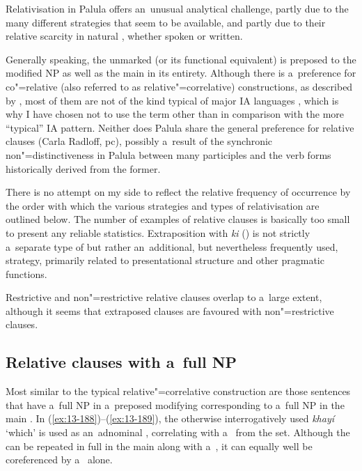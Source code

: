 Relativisation in Palula offers an~unusual analytical challenge, partly due to the many different strategies that seem to be available, and partly due to their relative scarcity in natural , whether spoken or written. 



Generally speaking, the unmarked  (or its functional equivalent) is preposed to the modified NP as well as the main  in its entirety. Although there is a~preference for co"=relative (also referred to as relative"=correlative) constructions, as described by \citet{downing1974}, most of them are not of the kind typical of major IA languages \citep[410--415]{masica1991}, which is why I have chosen not to use the term other than in comparison with the more ``typical'' IA pattern. Neither does Palula share the general \iliShina preference for  relative clauses (Carla Radloff, pc), possibly a~result of the synchronic non"=distinctiveness in Palula between many participles and the  verb forms historically derived from the former.



There is no attempt on my side to reflect the relative frequency of occurrence by the order with which the various strategies and types of relativisation are outlined below. The number of examples of relative clauses is basically too small to present any reliable statistics. Extraposition with \textit{ki} () is not strictly a~separate type of  but rather an~additional, but nevertheless frequently used, strategy, primarily related to presentational structure and other pragmatic functions.



Restrictive and non"=restrictive relative clauses overlap to a~large extent, although it seems that extraposed clauses are favoured with non"=restrictive clauses.


\subsection{Relative clauses with a~full NP}
\label{subsec:13-6-1}


Most similar to the typical \iliUrduHindi relative"=correlative construction are those sentences that have a~full NP in a~preposed modifying  corresponding to a~full NP in the main . In (\ref{ex:13-188})--(\ref{ex:13-189}), the otherwise interrogatively used \textit{khayí} `which' is used as an~adnominal , correlating with a~ from the  set. Although the  can be repeated in full in the main  along with a~, it can equally well be coreferenced by a~ alone.



